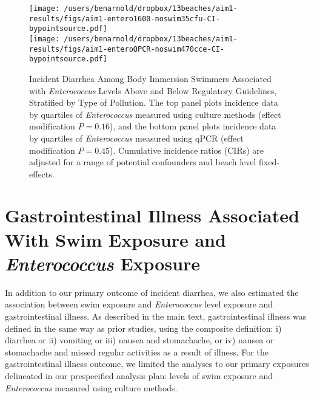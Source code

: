 \documentclass[12pt]{article}\usepackage[]{graphicx}\usepackage[]{color}
\begin{document}
\begin{figure}
\begin{center}
\texttt{[image: /users/benarnold/dropbox/13beaches/aim1-results/figs/aim1-entero1600-noswim35cfu-CI-bypointsource.pdf]} \\
\texttt{[image: /users/benarnold/dropbox/13beaches/aim1-results/figs/aim1-enteroQPCR-noswim470cce-CI-bypointsource.pdf]}
\caption{Incident Diarrhea Among Body Immersion Swimmers Associated with \textit{Enterococcus} Levels Above and Below Regulatory Guidelines, Stratified by Type of Pollution. The top panel plots incidence data by quartiles of \textit{Enterococcus} measured using culture methods (effect modification $P=0.16$), and the bottom panel plots incidence data by quartiles of \textit{Enterococcus} measured using qPCR (effect modification $P=0.45$).  Cumulative incidence ratios (CIRs) are adjusted for a range of potential confounders and beach level fixed-effects. \label{fig:enteropol}}
\end{center}
\end{figure}



\clearpage
\setcounter{table}{0}
\setcounter{figure}{0}
\section{Gastrointestinal Illness Associated With Swim Exposure and \textit{Enterococcus} Exposure}

In addition to our primary outcome of incident diarrhea, we also estimated the association between swim exposure and \textit{Enterococcus} level exposure and gastrointestinal illness. As described in the main text, gastrointestinal illness was defined in the same way as prior studies,\supercite{Wade2010-bb,Wade2010-ps,Colford2012-um,Arnold2013-xd,Yau2014-pl} using the composite definition: i) diarrhea or ii) vomiting or iii) nausea and stomachache, or iv) nausea or stomachache and missed regular activities as a result of illness.  For the gastrointestinal illness outcome, we limited the analyses to our primary exposures delineated in our prespecified analysis plan: levels of swim exposure and \textit{Enterococcus} measured using culture methods.
\end{document}
